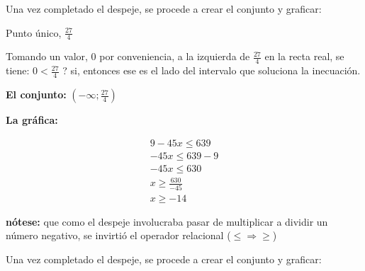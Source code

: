     Una vez completado el despeje, se procede a crear el conjunto y graficar:

    Punto único, $\displaystyle\frac{27}{4}$

    Tomando un valor, 0 por conveniencia, a la izquierda de $\displaystyle\frac{27}{4}$
    en la recta real,
    se tiene: $\displaystyle0<\frac{27}{4}$ ? si, entonces ese es el lado del intervalo que
    soluciona la inecuación.


    \textbf{El conjunto:} $\displaystyle\left(-\infty; \frac{27}{4}\right)$

    \textbf{La gráfica:}

    \vspace*{1cm}


    \begin{align*}
        9-45x \leq 639 		\\
        -45x \leq 639-9 \\
        -45x \leq 630 \\
        x \geq \frac{630}{-45} \\
        x \geq -14
    \end{align*}

    \textbf{nótese:} que como el despeje involucraba pasar de multiplicar a
    dividir un número negativo, se invirtió el operador relacional ($\leq \Rightarrow \geq$)

    Una vez completado el despeje, se procede a crear el conjunto y graficar:

